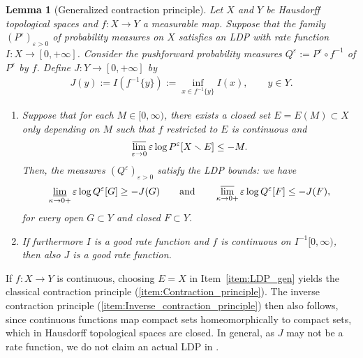 \documentclass[a4paper, 11pt]{article}
\newtheorem{lem}[thm]{Lemma}
\theoremstyle{definition}
\numberwithin{equation}{section}
\numberwithin{figure}{section}
\renewcommand{\liminf}{\varliminf}
\renewcommand{\limsup}{\varlimsup}
\begin{document}
\begin{lem}[{Generalized contraction principle}]\label{thm:contraction-principle-generalized}
Let $X$ and $Y$ be Hausdorff topological spaces and $f \colon X \to Y$ a measurable map. 
Suppose that the family $(P^\varepsilon)_{\varepsilon>0}$ of probability measures on $X$ satisfies an LDP 
with rate function $I \colon X \to [0,+\infty]$.
Consider the pushforward probability measures $Q^\varepsilon := P^\varepsilon\circ f^{-1}$ of $P^\varepsilon$ by $f$. 
Define $J \colon Y \to [0,+\infty]$ by
\begin{align*}
J(y) := I(f^{-1}\{y\}) 
:= \inf_{x \in f^{-1}\{y\}} I(x) , \qquad y \in Y .
\end{align*}

\begin{enumerate}[leftmargin=*, label=\textnormal{(\roman*)}]
\item \label{item:LDP_gen}
Suppose that for each $M \in [0,\infty)$, there exists a closed set $E = E(M) \subset X$ only depending on $M$ 
such that $f$ restricted to $E$ is continuous and
\begin{align} \label{eq:exp_tighness_gen}
\limsup_{\varepsilon\to 0} \varepsilon\log P^\varepsilon[X \smallsetminus E] \le -M.
\end{align}
Then, the measures $(Q^\varepsilon)_{\varepsilon > 0}$ satisfy the LDP bounds: 
we have
\begin{align*}
\liminf_{\kappa \to 0+}\varepsilon\log Q^\varepsilon[G] \ge 
-J(G) 
\qquad \textnormal{and} \qquad
\limsup_{\kappa \to 0+}\varepsilon\log Q^\varepsilon[F] \le 
-J(F),
\end{align*}
for every open $G \subset Y$ and closed $F \subset Y$.

\item \label{item:good}
If furthermore $I$ is a good rate function and $f$ is continuous on $I^{-1}[0,\infty)$, 
then also $J$ is a good rate function.
\end{enumerate}
\end{lem}

If $f \colon X \to Y$ is continuous, choosing $E = X$ in Item~\ref{item:LDP_gen} 
yields the classical contraction principle (\ref{item:Contraction_principle}). 
The inverse contraction principle (\ref{item:Inverse_contraction_principle}) then also follows, 
since continuous functions map compact sets homeomorphically to compact sets, 
which in Hausdorff topological spaces are closed. 
In general, as $J$ may not be a rate function, we do not claim an actual LDP in .
\end{document}
